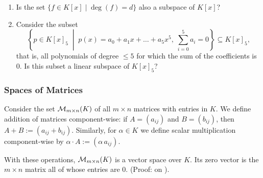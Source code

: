 \begin{question}
\label{q:degree_exactly_d}
\begin{enumerate}[label=\textbf{(\alph*)}]
    \item Is the set $\{f \in K[x] \mid \deg(f) = d\}$ also a subspace of $K[x]$?
    \item Consider the subset
    \[
    \left\{ p \in K[x]_5 \;\middle|\; p(x) = a_0 + a_1 x + \dots + a_5 x^5, \; \sum_{i=0}^{5} a_i = 0 \right\} \subseteq K[x]_5,
    \]
    that is, all polynomials of degree $\le 5$ for which the sum of the coefficients is $0$. Is this subset a linear subspace of $K[x]_5$?
\end{enumerate}
\end{question}

\subsubsection{Spaces of Matrices}

\begin{example}
\label{ex:matrix_space}
Consider the set $\mathcal{M}_{m \times n}(K)$ of all $m \times n$ matrices with entries in $K$. We define addition of matrices component-wise: if $A = (a_{ij})$ and $B = (b_{ij})$, then $A + B := (a_{ij} + b_{ij})$. Similarly, for $\alpha \in K$ we define scalar multiplication component-wise by $\alpha \cdot A := (\alpha \, a_{ij})$.

\begin{claim*}
\label{claim:matrix_space}
With these operations, $\mathcal{M}_{m \times n}(K)$ is a vector space over $K$. Its zero vector is the $m \times n$ matrix all of whose entries are $0$. (Proof: on ).
\end{claim*}
\end{example}

